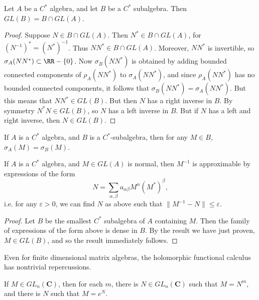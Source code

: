 \begin{corollary}
    Let $A$ be a $C^*$ algebra, and let $B$ be a $C^*$ subalgebra. Then $GL(B) = B \cap GL(A)$.
\end{corollary}
\begin{proof}
    Suppose $N \in B \cap GL(A)$. Then $N^* \in B \cap GL(A)$, for $(N^{-1})^* = (N^*)^{-1}$. Thus $NN^* \in B \cap GL(A)$. Moreover, $NN^*$ is invertible, so $\sigma_A(NN^*) \subset \RR - \{ 0 \}$. Now $\sigma_B(NN^*)$ is obtained by adding bounded connected components of $\rho_A(NN^*)$ to $\sigma_A(NN^*)$, and since $\rho_A(NN^*)$ has no bounded connected components, it follows that $\sigma_B(NN^*) = \sigma_A(NN^*)$. But this means that $NN^* \in GL(B)$. But then $N$ has a right inverse in $B$. By symmetry $N^*N \in GL(B)$, so $N$ has a left inverse in $B$. But if $N$ has a left and right inverse, then $N \in GL(B)$.
\end{proof}

\begin{corollary}
    If $A$ is a $C^*$ algebra, and $B$ is a $C^*$-subalgebra, then for any $M \in B$, $\sigma_A(M) = \sigma_B(M)$.
\end{corollary}

\begin{corollary}
    If $A$ is a $C^*$ algebra, and $M \in GL(A)$ is normal, then $M^{-1}$ is approximable by expressions of the form
    \[ N = \sum_{\alpha, \beta} a_{\alpha \beta} M^\alpha (M^*)^\beta, \]
    i.e. for any $\varepsilon > 0$, we can find $N$ as above such that $\| M^{-1} - N \| \leq \varepsilon$.
\end{corollary}
\begin{proof}
    Let $B$ be the smallest $C^*$ subalgebra of $A$ containing $M$. Then the family of expressions of the form above is dense in $B$. By the result we have just proven, $M \in GL(B)$, and so the result immediately follows.
\end{proof}

Even for finite dimensional matrix algebras, the holomorphic functional calculus has nontrivial repercussions.

\begin{corollary}
    If $M \in GL_n(\mathbf{C})$, then for each $m$, there is $N \in GL_n(\mathbf{C})$ such that $M = N^m$, and there is $N$ such that $M = e^N$.
\end{corollary}

